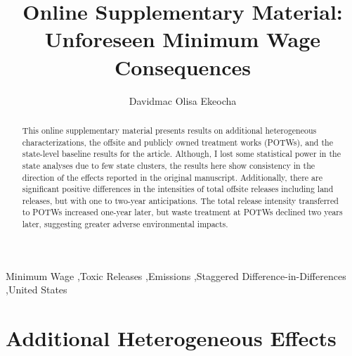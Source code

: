 \documentclass[authoryear, preprint, twocolumn, 1p]{elsarticle}
\begin{document}
    \begin{frontmatter}
        \title{Online Supplementary Material: Unforeseen Minimum Wage Consequences}
        \author[1]{Davidmac Olisa Ekeocha} %

        \begin{abstract}
            \noindent This online supplementary material presents results on additional heterogeneous characterizations, the offsite and publicly owned treatment works (POTWs), and the state-level baseline results for the article. Although, I lost some statistical power in the state analyses due to few state clusters, the results here show consistency in the direction of the effects reported in the original manuscript. Additionally, there are significant positive differences in the intensities of total offsite releases including land releases, but with one to two-year anticipations. The total release intensity transferred to POTWs increased one-year later, but waste treatment at POTWs declined two years later, suggesting greater adverse environmental impacts.
        \end{abstract}

        \begin{keyword}
            Minimum Wage \sep Toxic Releases \sep Emissions \sep Staggered Difference-in-Differences \sep United States
        \end{keyword}
    \end{frontmatter}


    \section{Additional Heterogeneous Effects}\label{sec:additional-heterogeneous-effects}
\end{document}
